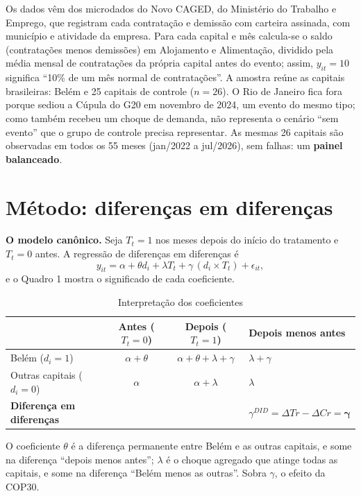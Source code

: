 \documentclass[12pt,a4paper]{article}
\begin{document}
Os dados vêm dos microdados do Novo CAGED, do Ministério do Trabalho e Emprego, que registram cada
contratação e demissão com carteira assinada, com município e atividade da empresa. Para cada capital
e mês calcula-se o saldo (contratações menos demissões) em Alojamento e Alimentação, dividido pela média
mensal de contratações da própria capital antes do evento; assim, $y_{it} = 10$ significa ``10\% de um
mês normal de contratações''. A amostra reúne as capitais brasileiras: Belém
e 25 capitais de controle ($n = 26$). O Rio de Janeiro fica fora porque sediou a Cúpula do G20 em
novembro de 2024, um evento do mesmo tipo; como também recebeu um choque de demanda, não representa
o cenário ``sem evento'' que o grupo de controle precisa representar. As mesmas 26 capitais são
observadas em todos os 55 meses (jan/2022 a jul/2026), sem falhas: um \textbf{painel balanceado}.

\section{Método: diferenças em diferenças}

\textbf{O modelo canônico.} Seja $T_t = 1$ nos meses depois do início do tratamento e $T_t = 0$ antes.
A regressão de diferenças em diferenças é
\begin{equation}
y_{it} = \alpha + \theta d_i + \lambda T_t + \gamma\,(d_i \times T_t) + \epsilon_{it},
\end{equation}
e o Quadro 1 mostra o significado de cada coeficiente.

\begin{table}[H]
\centering\small
\caption{Interpretação dos coeficientes}
\begin{tabularx}{\linewidth}{lccL}
\toprule
 & \textbf{Antes ($T_t = 0$)} & \textbf{Depois ($T_t = 1$)} & \textbf{Depois menos antes}\\
\midrule
Belém ($d_i = 1$) & $\alpha + \theta$ & $\alpha + \theta + \lambda + \gamma$ & $\lambda + \gamma$\\
Outras capitais ($d_i = 0$) & $\alpha$ & $\alpha + \lambda$ & $\lambda$\\
\midrule
\textbf{Diferença em diferenças} & & & $\gamma^{DID} = \Delta Tr - \Delta Cr = \boldsymbol{\gamma}$\\
\bottomrule
\end{tabularx}
\end{table}

O coeficiente $\theta$ é a diferença permanente entre Belém e as outras capitais, e some na diferença
``depois menos antes''; $\lambda$ é o choque agregado que atinge todas as capitais, e some na
diferença ``Belém menos as outras''. Sobra $\gamma$, o efeito da COP30.
\end{document}
